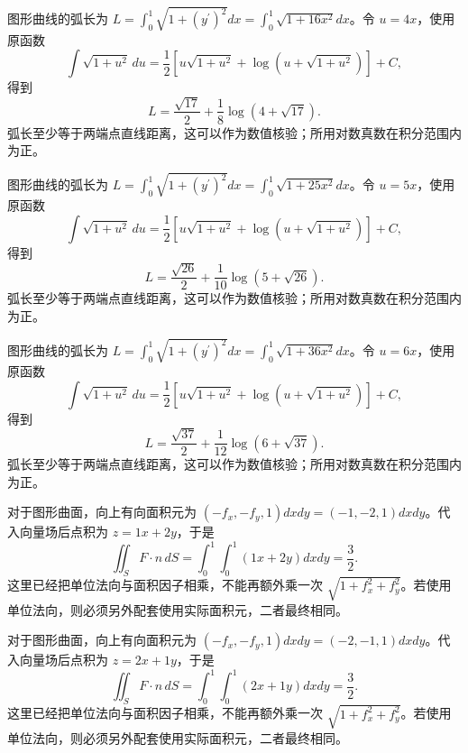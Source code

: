 \documentclass[12pt,fontset=fandol]{ctexart}
\begin{document}
\begin{solve}\label{ans:c42q4}
图形曲线的弧长为 $L=\int_0^1\sqrt{1+(y^{\prime})^2}dx=\int_0^1\sqrt{1+16x^2}dx$。令 $u=4x$，使用原函数
\[
\int\sqrt{1+u^2}\,du=\frac12\left[u\sqrt{1+u^2}+\log(u+\sqrt{1+u^2})\right]+C,
\]
得到
\[
L=\frac{\sqrt{17}}2+\frac{1}{8}\log(4+\sqrt{17}).
\]
弧长至少等于两端点直线距离，这可以作为数值核验；所用对数真数在积分范围内为正。
\end{solve}

\begin{solve}\label{ans:c42q5}
图形曲线的弧长为 $L=\int_0^1\sqrt{1+(y^{\prime})^2}dx=\int_0^1\sqrt{1+25x^2}dx$。令 $u=5x$，使用原函数
\[
\int\sqrt{1+u^2}\,du=\frac12\left[u\sqrt{1+u^2}+\log(u+\sqrt{1+u^2})\right]+C,
\]
得到
\[
L=\frac{\sqrt{26}}2+\frac{1}{10}\log(5+\sqrt{26}).
\]
弧长至少等于两端点直线距离，这可以作为数值核验；所用对数真数在积分范围内为正。
\end{solve}

\begin{solve}\label{ans:c42q6}
图形曲线的弧长为 $L=\int_0^1\sqrt{1+(y^{\prime})^2}dx=\int_0^1\sqrt{1+36x^2}dx$。令 $u=6x$，使用原函数
\[
\int\sqrt{1+u^2}\,du=\frac12\left[u\sqrt{1+u^2}+\log(u+\sqrt{1+u^2})\right]+C,
\]
得到
\[
L=\frac{\sqrt{37}}2+\frac{1}{12}\log(6+\sqrt{37}).
\]
弧长至少等于两端点直线距离，这可以作为数值核验；所用对数真数在积分范围内为正。
\end{solve}

\begin{solve}\label{ans:c42q7}
对于图形曲面，向上有向面积元为 $(-f_x,-f_y,1)dxdy=(-1,-2,1)dxdy$。代入向量场后点积为 $z=1x+2y$，于是
\[
\iint_SF\cdot n\,dS=\int_0^1\int_0^1(1x+2y)dxdy=\frac{3}{2}.
\]
这里已经把单位法向与面积因子相乘，不能再额外乘一次 $\sqrt{1+f_x^2+f_y^2}$。若使用单位法向，则必须另外配套使用实际面积元，二者最终相同。
\end{solve}

\begin{solve}\label{ans:c42q8}
对于图形曲面，向上有向面积元为 $(-f_x,-f_y,1)dxdy=(-2,-1,1)dxdy$。代入向量场后点积为 $z=2x+1y$，于是
\[
\iint_SF\cdot n\,dS=\int_0^1\int_0^1(2x+1y)dxdy=\frac{3}{2}.
\]
这里已经把单位法向与面积因子相乘，不能再额外乘一次 $\sqrt{1+f_x^2+f_y^2}$。若使用单位法向，则必须另外配套使用实际面积元，二者最终相同。
\end{solve}
\end{document}
